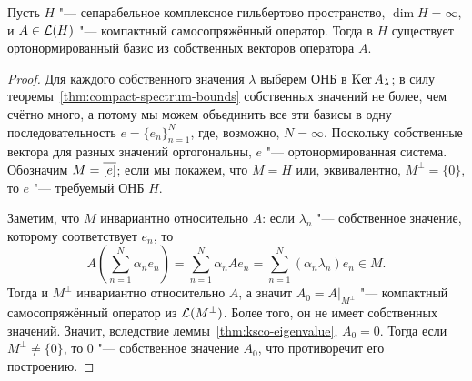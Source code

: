\documentclass[main]{subfiles}
\begin{document}
\begin{theorem}
  Пусть \( H \) "--- сепарабельное комплексное гильбертово пространство,
  \( \dim H = \infty \), и
  \( A \in \Linears{H} \) "--- компактный самосопряжённый оператор.
  Тогда в \( H \) существует ортонормированный базис
  из собственных векторов оператора \( A \).
\end{theorem}
\begin{proof}
  Для каждого собственного значения \( \lambda \)
  выберем ОНБ в \( \operatorname{Ker} A_\lambda \);
  в силу теоремы~\ref{thm:compact-spectrum-bounds}
  собственных значений не более, чем счётно много,
  а потому мы можем объединить все эти базисы
  в одну последовательность \( e = \{ e_n \}_{n=1}^N \),
  где, возможно, \( N = \infty \).
  Поскольку собственные вектора для разных значений
  ортогональны, \( e \) "--- ортонормированная система.
  Обозначим \( M = \overline{[e]} \);
  если мы покажем, что \( M = H \) или,
  эквивалентно, \( M^\perp = \{ 0 \} \),
  то \( e \) "--- требуемый ОНБ \( H \).

  Заметим, что \( M \) инвариантно относительно \( A \):
  если \( \lambda_n \) "--- собственное значение,
  которому соответствует \( e_n \), то
  \[
    A (\sum_{n=1}^N \alpha_n e_n) =
    \sum_{n=1}^N \alpha_n A e_n =
    \sum_{n=1}^N (\alpha_n \lambda_n) e_n \in M.
  \]
  Тогда и \( M^\perp \) инвариантно относительно \( A \),
  а значит \( A_0 = A \bigr|_{M^\perp} \) "---
  компактный самосопряжённый оператор из \( \Linears{M^\perp} \).
  Более того, он не имеет собственных значений.
  Значит, вследствие леммы~\ref{thm:ksco-eigenvalue},
  \( A_0 = 0 \).
  Тогда если \( M^\perp \ne \{ 0 \} \), то \( 0 \) "---
  собственное значение \( A_0 \),
  что противоречит его построению.
\end{proof}

\end{document}
